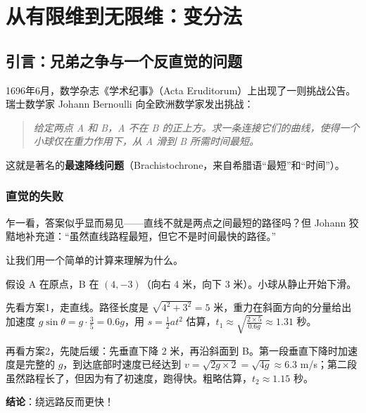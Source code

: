 \chapter{从有限维到无限维：变分法}

\section*{引言：兄弟之争与一个反直觉的问题}

1696年6月，数学杂志《学术纪事》（Acta Eruditorum）上出现了一则挑战公告。瑞士数学家 Johann Bernoulli 向全欧洲数学家发出挑战：

\begin{quote}
\textit{给定两点 A 和 B，A 不在 B 的正上方。求一条连接它们的曲线，使得一个小球仅在重力作用下，从 A 滑到 B 所需时间最短。}
\end{quote}

这就是著名的\textbf{最速降线问题}（Brachistochrone，来自希腊语“最短”和“时间”）。

\subsection*{直觉的失败}

乍一看，答案似乎显而易见——直线不就是两点之间最短的路径吗？但 Johann 狡黠地补充道：“虽然直线路程最短，但它不是时间最快的路径。”

让我们用一个简单的计算来理解为什么。

\begin{example}[直线 vs 折线]
假设 A 在原点，B 在 $(4, -3)$（向右 4 米，向下 3 米）。小球从静止开始下滑。

先看方案1，走直线。路径长度是 $\sqrt{4^2 + 3^2} = 5$ 米，重力在斜面方向的分量给出加速度 $g \sin\theta = g \cdot \frac{3}{5} = 0.6g$，用 $s = \frac{1}{2}at^2$ 估算，$t_1 \approx \sqrt{\frac{2 \times 5}{0.6g}} \approx 1.31$ 秒。

再看方案2，先陡后缓：先垂直下降 2 米，再沿斜面到 B。第一段垂直下降时加速度是完整的 $g$，到达底部时速度已经达到 $v = \sqrt{2g \times 2} = \sqrt{4g} \approx 6.3$ m/s；第二段虽然路程长了，但因为有了初速度，跑得快。粗略估算，$t_2 \approx 1.15$ 秒。

\textbf{结论}：绕远路反而更快！
\end{example}

